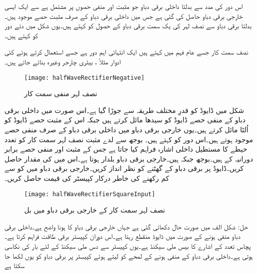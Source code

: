 اس دور کی مدد سے بدلتا داخلی برقی دباو جو مثبت اور منفی حصوں پر مشتمل ہے سے ایک ایسی خارجی برقی دباو حاصل کی گئی ہے جس میں داخلی برقی دباو کے صرف مثبت حصے موجود ہیں۔ بدلتا برقی دباو سے نصف لہر کی یک سمت برقی دباو کے حصول کو   کہتے ہیں۔یوں شکل  میں دئے دور کو   کہتے ہیں۔

نصف سمت کار جسے عام فہم میں  کہتے ہیں ایک انتہائی اہم دور ہے جسے استعمال کرتے ہوئے کئی ادوار مثلاً   ، بیٹری چارجر وغیرہ بنائے جاتے ہیں۔
\begin{figure}
\centering
\texttt{[image: halfWaveRectifierNegative]}
\caption{نصف لہر منفی سمت کار}
\label{شکل_نصف_لہر_منفی_سمت_کار}
\end{figure}
شکل  میں ڈایوڈ کو قدرِ مختلف طریقہ سے جوڑا گیا ہے۔اس صورت میں داخلی برقی دباو  کے منفی حصے ڈایوڈ کو سیدھا مائل کرتے ہیں جبکہ اس کے مثبت حصے ڈایوڈ کو اُلٹا مائل کرتے ہیں۔یوں خارجی برقی دباو میں داخلی برقی دباو کے صرف منفی حصے موجود ہوتے ہیں۔اس دور کو  کہتے ہیں۔
بوجھ سے لدے مثبت نصف لہر سمت کار کو  تعدد  حیطے کا مستطیل داخلی اشارہ فراہم کیا جاتا ہے جس کے مثبت اور منفی حصے برابر دورانیہ کے ہیں۔بوجھ  جبکہ  ہیں۔خارجی برقی دباو بلدار ہوتا ہے۔اس میں  کی مقدار حاصل کریں۔ڈایوڈ پر برقی دباو کے گھٹنے کو نظر انداز کریں۔خارجی برقی دباو میں  کو  سے کم رکھنے کی خاطر درکار کپیسٹر کی قیمت حاصل کریں۔
\begin{figure}
\centering
\texttt{[image: halfWaveRectifierSquareInput]}
\caption{نصف لہر سمت کار کے خارجی برقی دباو میں بل}
\label{شکل_نصف_لہر_سمتکار_بل}
\end{figure}
حل:
شکل  الف میں صورت حال دکھائی گئی ہے جہاں خارجی برقی دباو کا  ہونا واضح ہے۔داخلی برقی دباو منفی ہونے کے صورت میں ڈایوڈ منقطع رہتا ہے۔اس دوران کپیسٹر  برقی طاقت فراہم کرتا ہے۔پچاس تعدد کے اشارے کا  بیس ملی سیکنڈ ہے۔یوں کپیسٹر سے دس ملی سیکنڈ کے لئے بار کی نکاسی ہوتی ہے۔داخلی برقی دباو کے منفی ہونے کے لمحے کو  لیتے ہوئے کپیسٹر پر برقی دباو  کو یوں لکھا جا سکتا ہے
